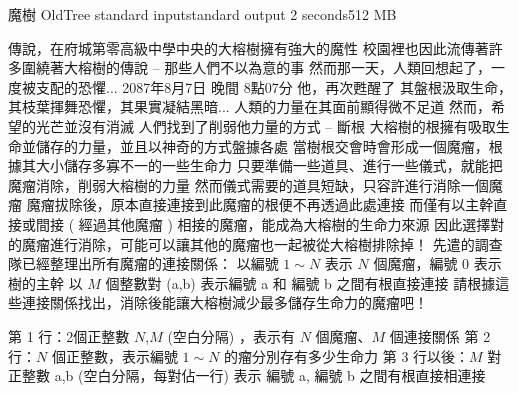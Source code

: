 \gdef\thisproblemauthor{}
\gdef\thisproblemdeveloper{}
\gdef\thisproblemorigin{}
\begin{problem}{魔樹 OldTree}
{standard input}{standard output}
{2 seconds}{512 MB}{}

傳說，在府城第零高級中學中央的大榕樹擁有強大的魔性\newline
校園裡也因此流傳著許多圍繞著大榕樹的傳說 -- 那些人們不以為意的事\newline
然而那一天，人類回想起了，一度被支配的恐懼...\newline
\newline
2087年8月7日 晚間 8點07分\newline
他，再次甦醒了\newline
其盤根汲取生命，其枝葉揮舞恐懼，其果實凝結黑暗...\newline
人類的力量在其面前顯得微不足道\newline
然而，希望的光芒並沒有消滅\newline
人們找到了削弱他力量的方式 -- 斷根\newline
\newline
大榕樹的根擁有吸取生命並儲存的力量，並且以神奇的方式盤據各處\newline
當樹根交會時會形成一個魔瘤，根據其大小儲存多寡不一的一些生命力\newline
只要準備一些道具、進行一些儀式，就能把魔瘤消除，削弱大榕樹的力量\newline
然而儀式需要的道具短缺，只容許進行消除一個魔瘤\newline
\newline
魔瘤拔除後，原本直接連接到此魔瘤的根便不再透過此處連接\newline
而僅有以主幹直接或間接 ( 經過其他魔瘤 ) 相接的魔瘤，能成為大榕樹的生命力來源\newline
因此選擇對的魔瘤進行消除，可能可以讓其他的魔瘤也一起被從大榕樹排除掉！\newline
\newline
\newline
先遣的調查隊已經整理出所有魔瘤的連接關係：\newline
以編號 $1 \sim N$ 表示 $N$ 個魔瘤，編號 0 表示樹的主幹\newline
以 $M$ 個整數對 (a,b) 表示編號 a 和 編號 b 之間有根直接連接\newline
請根據這些連接關係找出，消除後能讓大榕樹減少最多儲存生命力的魔瘤吧！\newline


\InputFile

第 1 行：2個正整數 $N$,$M$ (空白分隔) ，表示有 $N$ 個魔瘤、$M$ 個連接關係 \newline
第 2 行：$N$ 個正整數，表示編號 $1 \sim N$ 的瘤分別存有多少生命力 \newline
第 3 行以後：$M$ 對正整數 a,b (空白分隔，每對佔一行) \newline
                      表示 編號 a, 編號 b 之間有根直接相連接  \newline


\end{problem}
